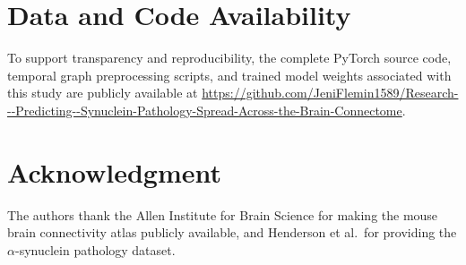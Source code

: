 \documentclass[conference]{IEEEtran}
\begin{document}
\section*{Data and Code Availability}
To support transparency and reproducibility, the complete PyTorch source code, temporal graph preprocessing scripts, and trained model weights associated with this study are publicly available at \url{https://github.com/JeniFlemin1589/Research---Predicting--Synuclein-Pathology-Spread-Across-the-Brain-Connectome}.

\section*{Acknowledgment}
The authors thank the Allen Institute for Brain Science for making the mouse brain connectivity atlas publicly available, and Henderson et al.\ for providing the $\alpha$-synuclein pathology dataset.

\balance


\end{document}
